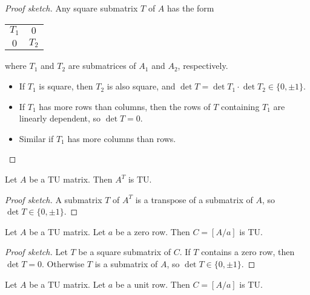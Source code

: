 \begin{proof}[Proof sketch]
  Any square submatrix $T$ of $A$ has the form
  \begin{tabular}{cc}
    \cline{1-2}
    \multicolumn{1}{|c|}{$T_{1}$} & \multicolumn{1}{c|}{    $0$} \\ \cline{1-2}
    \multicolumn{1}{|c|}{    $0$} & \multicolumn{1}{c|}{$T_{2}$} \\ \cline{1-2}
  \end{tabular}
  where $T_{1}$ and $T_{2}$ are submatrices of $A_{1}$ and $A_{2}$, respectively.
  \begin{itemize}
    \item If $T_{1}$ is square, then $T_{2}$ is also square, and $\det T = \det T_{1} \cdot \det T_{2} \in \{0, \pm 1\}$.
    \item If $T_{1}$ has more rows than columns, then the rows of $T$ containing $T_{1}$ are linearly dependent, so $\det T = 0$.
    \item Similar if $T_{1}$ has more columns than rows.
  \end{itemize}
\end{proof}

\begin{lemma}[transpose of TU is TU]
  \label{lem:code_tu_transpose}
  Let $A$ be a TU matrix. Then $A^{T}$ is TU.
\end{lemma}

\begin{proof}[Proof sketch]
  A submatrix $T$ of $A^{T}$ is a transpose of a submatrix of $A$, so $\det T \in \{0, \pm 1\}$.
\end{proof}

\begin{lemma}
  \label{lem:code_tu_add_zero_row}
  Let $A$ be a TU matrix. Let $a$ be a zero row. Then $C = \left[ A / a \right]$ is TU.
\end{lemma}

\begin{proof}[Proof sketch]
  Let $T$ be a square submatrix of $C$. If $T$ contains a zero row, then $\det T = 0$. Otherwise $T$ is a submatrix of $A$, so $\det T \in \{0, \pm 1\}$.
\end{proof}

\begin{lemma}
  \label{lem:code_tu_add_unit_row}
  Let $A$ be a TU matrix. Let $a$ be a unit row. Then $C = \left[ A / a \right]$ is TU.
\end{lemma}


